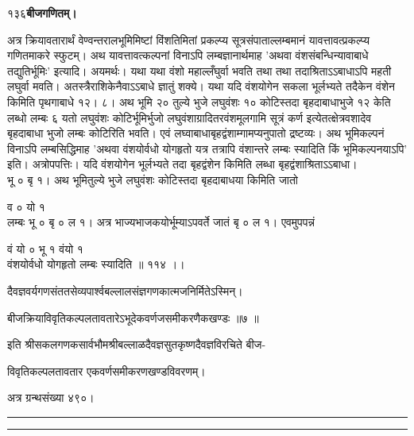 \documentclass[11pt, openany]{book}
\begin{document}
\onehalfspacing
१३६\hspace{2in}\textbf{बीजगणितम्।} 

\vspace{5mm}

\begin{sloppypar}
\hangindent=0.2in \hspace{0.2in}अत्र क्रियावतारार्थं वेण्वन्तरालभूमिमिष्टां विंशतिमितां प्रकल्प्य सूत्रसंपाताल्लम्बमानं यावत्तावत्प्रकल्प्य गणितमाकरे स्फुटम्। अथ यावत्तावत्कल्पनां विनाऽपि लम्बज्ञानार्थमाह 'अथवा वंशसंबन्धिन्यावाबाधे तद्युतिर्भूमिः' इत्यादि। अयमर्थः। यथा यथा वंशो महाल्लँघुर्वा भवति तथा तथा तदाश्रिताऽऽबाधाऽपि महती लघुर्वा मवति। अतस्त्रैराशिकेनैवाऽऽबाधे ज्ञातुं शक्ये। यथा यदि वंशयोगेन सकला भूर्लभ्यते तदैकेन वंशेन किमिति पृथगाबाधे १२। ८। अथ भूमि २० तुल्ये भुजे लघुवंशः १० कोटिस्तदा बृहदाबाधाभुजे १२ केति लब्धो लम्बः ६ यतो लघुवंशः कोटिर्भूमिर्भुजो लघुवंशाग्रादितरवंशमूलगामि सूत्रं कर्ण इत्येतत्क्षेत्रवशादेव बृहदाबाधा भुजो लम्बः कोटिरिति भवति। एवं लघ्वाबाधाबृहद्वंशाम्गामप्यनुपातो द्रष्टव्यः। अथ भूमिकल्पनं विनाऽपि लम्बसिद्धिमाह 'अथवा वंशयोर्वधो योगहृतो यत्र तत्रापि वंशान्तरे लम्बः स्यादिति किं भूमिकल्पनयाऽपि' इति। अत्रोपपत्तिः। यदि वंशयोगेन भूर्लभ्यते तदा बृहद्वंशेन किमिति लब्धा बृहद्वंशाश्रिताऽऽबाधा।\\भू ० बृ १। अथ भूमितुल्ये भुजे लघुवंशः कोटिस्तदा बृहदाबाधया किमिति जातो

व ० यो १\\

\hangindent=0.2in लम्बः भू ० बृ ० ल १। अत्र भाज्यभाजकयोर्भूम्याऽपवर्ते जातं बृ ० ल १। एवमुपपन्नं

\hspace{0.4in}वं यो ० भू १\hspace{2.75in} वंयो १\\

\hangindent=0.2in वंशयोर्वधो योगहृतो लम्बः स्यादिति ॥ ११४ ।।

\begin{center}
दैवज्ञवर्यगणसंततसेव्यपार्श्वबल्लालसंज्ञगणकात्मजनिर्मितेऽस्मिन्।

बीजक्रियाविवृतिकल्पलतावतारेऽभूदेकवर्णजसमीकरणैकखण्डः ॥७ ॥

इति श्रीसकलगणकसार्वभौमश्रीबल्लाळदैवज्ञसुतकृष्णदैवज्ञविरचिते बीज-

विवृतिकल्पलतावतार एकवर्णसमीकरणखण्डविवरणम्।

अत्र ग्रन्थसंख्या ४९०।

\rule{0.1\linewidth}{0.5pt}

\vspace{-5mm}

\rule{0.1\linewidth}{0.5pt}
\end{center}
\end{sloppypar}
\thispagestyle{empty}
\newpage
\end{document}
